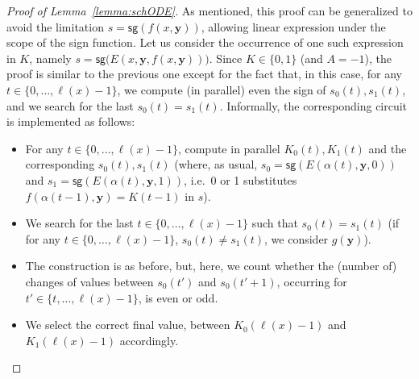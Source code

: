 \documentclass[11pt, oneside]{article}
\newenvironment{toappendix}{}{}
\newcommand{\longv}[1]{}
\newcommand{\fun}[1]{\mathsf{#1}}
\newcommand{\tu}[1]{\mathbf{#1}}
\theoremstyle{definition}
\newtheorem{remark}{Remark}
\newcommand{\ODEACC}{\ell\text{-ODE}_{\text{FACC[2]}}}
\newcommand{\schODE}{\ell\text{-b}_0\text{ODE}}
\begin{document}
\begin{toappendix}
\begin{proof}[Proof of Lemma~\ref{lemma:schODE}]
    As mentioned, this proof can be generalized to avoid the limitation $s=\fun{sg}(f(x,\tu y))$, allowing linear expression under the scope of the sign function.
    Let us consider the occurrence of one such expression in $K$, namely $s=\fun{sg}\big(E(x, \tu y, f(x,\tu y))\big)$.
    Since $K\in \{0,1\}$ (and $A=-1$), the proof is similar to the previous one except for the fact that, in this case, for any $t\in \{0, \dots, \ell(x)-1\}$, we compute (in parallel) even the sign of $s_0(t), s_1(t)$, and we search for the last $s_0(t)=s_1(t)$.
    Informally, the corresponding circuit is implemented as follows:
    \begin{itemize}
        \itemsep0em
        \item For any $t\in \{0, \dots, \ell(x)-1\}$, compute in parallel $K_0(t), K_1(t)$ and the corresponding $s_0(t), s_1(t)$ (where, as usual, $s_0=\fun{sg}(E(\alpha(t), \tu y,0))$ and $s_1=\fun{sg}(E(\alpha(t),\tu y,1))$, i.e.~0 or 1 substitutes $f(\alpha(t-1), \tu y) =K(t-1)$ in $s$).
        \item We search for the last $t\in \{0, \dots, \ell(x)-1\}$ such that $s_0(t)=s_1(t)$ (if for any $t\in \{0,\dots, \ell(x)-1\}$, $s_0(t)\neq s_1(t)$, we consider $g(\tu y)$).
        \item The construction is as before, but, here, we count whether the (number of) changes of values between $s_0(t')$ and $s_0(t'+1)$, occurring for $t'\in \{t, \dots, \ell(x)-1\}$, is even or odd.
        \item We select the correct final value, between $K_0(\ell(x)-1)$ and $K_1(\ell(x)-1)$ accordingly. 
    \end{itemize}
\end{proof}



\longv{
\marginpar{\textcolor{red}{A direct connection between $\ODEACC$ and $\schODE$ is missing}}
\begin{remark}[Relationship with $\ODEACC$ and $\schODE$]
    \textcolor{blue}{Both $\ODEACC$ and $\schODE$, restricted to occurrences of the form $s=\fun{sg}(f(x,\tu y))$, are special cases of the schema presented in Lemma~\ref{lemma:kkODE}.
    Indeed, any instance of $\ODEACC$
    can be seen as an instance of the given schema such that $k(x, \tu y)=2h(x, \tu y)$ and $k'(x, \tu y)=\frac{1}{2}$.
    On the other hand, $\schODE$ can be rewritten as an IVP such that $k(x, \tu y)= K_0(x)\times K_1(x)+ (1-K_0(x)) \times (1-K_1(x))$, while $k'(x, \tu y)$ is a convoluted expression involving $K_0(x)$ and $K_1(x)$ and described in Lemma~\ref{lemma:schODE}.}
\end{remark}
}



\end{toappendix}
\end{document}

